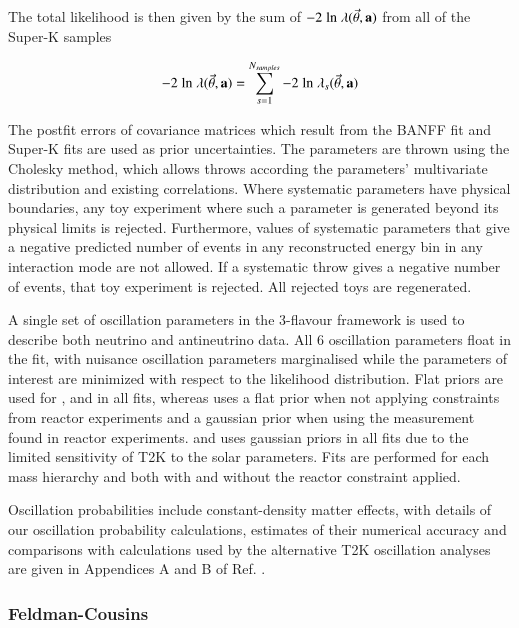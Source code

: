 The total likelihood is then given by the sum of $-2 \; \textrm{ln} \; \lambda (\vec{\theta},{\bf a})$ from all of the Super-K samples

\begin{equation} \label{eq:totlike_2}
-2 \; \textrm{ln} \; \lambda (\vec{\theta},{\bf a}) = \sum_{s=1}^{N_{samples}} -2 \; \textrm{ln} \; \lambda_s (\vec{\theta},{\bf a})
\end{equation}

The postfit errors of covariance matrices which result from the BANFF fit and Super-K fits are used as prior uncertainties. The parameters are thrown using the Cholesky method, which allows throws according the parameters' multivariate distribution and existing correlations. Where systematic parameters have physical boundaries, any toy experiment where such a parameter is generated beyond its physical limits is rejected. Furthermore, values of systematic parameters that give a negative predicted number of events in any reconstructed energy bin in any interaction mode are not allowed. If a systematic throw gives a negative number of events, that toy experiment is rejected. All rejected toys are regenerated.

A single set of oscillation parameters in the 3-flavour framework is used to describe both neutrino and antineutrino data. All 6 oscillation parameters float in the fit, with nuisance oscillation parameters marginalised while the parameters of interest are minimized with respect to the likelihood distribution. Flat priors are used for \ssqthtwothree, \dmsqtwothree and \deltacp in all fits, whereas \ssqthonethree uses a flat prior when not applying constraints from reactor experiments and a gaussian prior when using the measurement found in reactor experiments. \ssqthonetwo and \dmsqonetwo uses gaussian priors in all fits due to the limited sensitivity of T2K to the solar parameters. Fits are performed for each mass hierarchy and both with and without the reactor constraint applied.

Oscillation probabilities include constant-density matter effects, with details of our oscillation probability calculations, estimates of their numerical accuracy and comparisons with calculations used by the alternative T2K oscillation analyses are given in Appendices A and B of Ref. \cite{OurRun123DisappAnalysis3Flavour}.

\subsubsection{Feldman-Cousins}
\label{sec:intro:procedure:fc}

